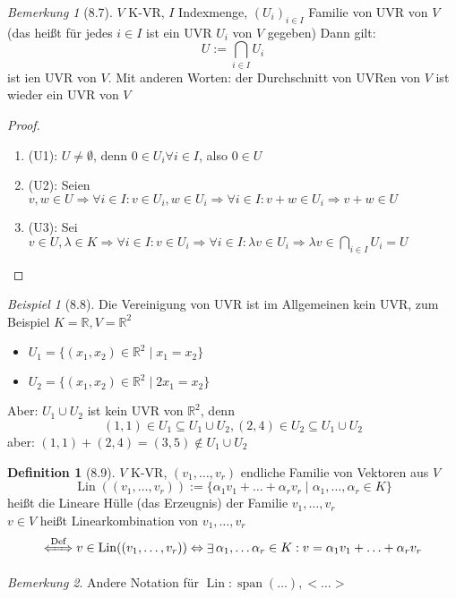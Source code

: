 \documentclass[a4paper]{scrartcl}
\DeclareMathOperator{\Exists}{\exists}
\DeclareMathOperator{\Forall}{\forall}
\DeclareMathOperator{\Lin}{Lin}
\DeclareMathOperator{\Span}{span}
\theoremstyle{definition}
\newtheorem{defn}{Definition}
\theoremstyle{plain}
\theoremstyle{plain}
\theoremstyle{remark}
\newtheorem{remark}{Bemerkung}
\theoremstyle{remark}
\theoremstyle{remark}
\newtheorem{ex}{Beispiel}
\begin{document}
\begin{remark}[8.7]
$V$ K-VR, $I$ Indexmenge, $(U_i)_{i\in I}$ Familie von UVR von $V$ (das heißt für jedes $i\in I$ ist ein UVR $U_i$ von $V$ gegeben)
Dann gilt:
\[U := \bigcap_{i \in I} U_i\]
ist ien UVR von $V$. Mit anderen Worten: der Durchschnitt von UVRen von $V$ ist wieder ein UVR von $V$
\end{remark}
\begin{proof}
\begin{enumerate}
\item (U1): $U \neq \emptyset$, denn $0 \in U_i \Forall i\in I$, also $0 \in U$
\item (U2): Seien $v,w \in U \Rightarrow \Forall i \in I: v\in U_i, w \in U_i \Rightarrow \Forall i\in I: v + w \in U_i \Rightarrow v + w \in U$
\item (U3): Sei $v \in U, \lambda \in K \Rightarrow \Forall i\in I: v\in U_i \Rightarrow \Forall i\in I: \lambda v \in U_i \Rightarrow \lambda v \in \bigcap_{i\in I} U_i = U$
\end{enumerate}
\end{proof}
\begin{ex}[8.8]
Die Vereinigung von UVR ist im Allgemeinen kein UVR, zum Beispiel $K = \mathbb{R}, V =\mathbb{R}^2$
\begin{itemize}
\item $U_1 = \{(x_1, x_2) \in \mathbb{R}^2 \mid x_1 = x_2\}$
\item $U_2 = \{(x_1, x_2) \in \mathbb{R}^2 \mid 2 x_1 = x_2\}$
\end{itemize}
Aber: $U_1 \cup U_2$ ist kein UVR von $\mathbb{R}^2$, denn
\[(1,1) \in U_1 \subseteq U_1 \cup U_2, (2, 4) \in U_2 \subseteq U_1 \cup U_2\]
aber: $(1, 1) + (2, 4) = (3, 5) \not\in U_1 \cup U_2$
\end{ex}
\begin{defn}[8.9]
$V$ K-VR, $(v_1, \ldots, v_r)$ endliche Familie von Vektoren aus $V$
\[\Lin((v_1, \ldots, v_r)) := \{\alpha_1 v_1 + \ldots + \alpha_r v_r \mid \alpha_1, \ldots, \alpha_r \in K\}\]
heißt die Lineare Hülle (das Erzeugnis) der Familie $v_1, \ldots, v_r$ \\
  $v \in V$ heißt Linearkombination von $v_1, \ldots, v_r$
\[\xLeftrightarrow{\text{Def}} v\in \Lin((v_1, \ldots, v_r)) \Leftrightarrow \Exists \alpha_1, \ldots \alpha_r \in K: v = \alpha_1 v_1 + \ldots + \alpha_r v_r\]
\end{defn}
\begin{remark}
Andere Notation für $\Lin: \Span(\ldots), <\ldots>$
\end{remark}
\end{document}
